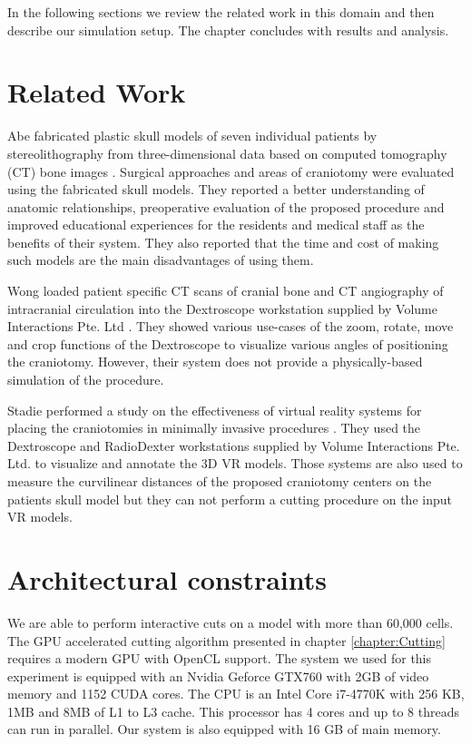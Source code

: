 In the following sections we review the related work in this domain and then describe our simulation 
setup. The chapter concludes with results and analysis.

\section{Related Work}
Abe \etal fabricated plastic skull models of seven individual patients by stereolithography from three-dimensional
data based on computed tomography (CT) bone images \cite{Abe1998}. Surgical approaches and areas of craniotomy were 
evaluated using the fabricated skull models. They reported a better understanding of anatomic relationships, preoperative
evaluation of the proposed procedure and improved educational experiences for the residents and medical staff as the benefits of 
their system. They also reported that the time and cost of making such models are the main disadvantages of using them.

Wong \etal loaded patient specific CT scans of cranial bone and CT angiography of intracranial circulation
into the Dextroscope workstation supplied by Volume Interactions Pte. Ltd \cite{Wong2007}. They showed various 
use-cases of the zoom, rotate, move and crop functions of the Dextroscope to visualize various angles of 
positioning the craniotomy. However, their system does not provide a physically-based simulation of the procedure. 

Stadie \etal performed a study on the effectiveness of virtual reality systems for placing the craniotomies 
in minimally invasive procedures \cite{Stadie2011}.  They used the Dextroscope and RadioDexter workstations 
supplied by Volume Interactions Pte. Ltd. to visualize and annotate the 3D VR models. 
Those systems are also used to measure the curvilinear distances of the proposed craniotomy centers on the 
patients skull model but they can not perform a cutting procedure on the input VR models.





\section{Architectural constraints}
We are able to perform interactive cuts on a model with more than 60,000 cells. The GPU accelerated cutting algorithm 
presented in chapter \ref{chapter:Cutting} requires a modern GPU with OpenCL support. The system we used for this
experiment is equipped with an Nvidia Geforce GTX760 with 2GB of video memory and 1152 CUDA cores. The CPU is an 
Intel Core i7-4770K with 256 KB, 1MB and 8MB of L1 to L3 cache. This processor has 4 cores and up to 8 threads can run in parallel. 
Our system is also equipped with 16 GB of main memory. 

